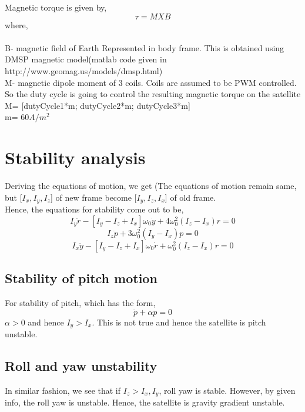 \documentclass[10pt,a4paper]{report}
\begin{document}
Magnetic torque is given by,
\begin{equation}
\tau=M X B
\end{equation}
where,\\ \\
B- magnetic field of Earth Represented in body frame. This is obtained using DMSP magnetic model(matlab code given in http://www.geomag.us/models/dmsp.html)\\ 
M- magnetic dipole moment of 3 coils.
Coils are assumed to be PWM controlled. So the duty cycle is going to control the resulting magnetic torque on the satellite \\
M= [dutyCycle1*m; dutyCycle2*m; dutyCycle3*m]\\
m= $60A/m^2$


\chapter{Stability analysis}
Deriving the equations of motion, we get (The equations of motion remain same, but [$I_{x},I_{y},I_{z}$] of new frame become [$I_{y},I_{z},I_{x}$] of old frame.\\
Hence, the equations for stability come out to be,
\begin{equation}
I_{y}\ddot{r}-[I_{y}-I_{z}+I_{x}]\omega_{0}\dot{y}+4\omega_{0}^{2}(I_{z}-I_{x})r=0
\end{equation}
\begin{equation}
I_{z}\ddot{p}+3\omega_{0}^{2}(I_{y}-I_{x})p=0
\end{equation}
\begin{equation}
I_{x}\ddot{y}-[I_{y}-I_{z}+I_{x}]\omega_{0}\dot{r}+\omega_{0}^{2}(I_{z}-I_{x})r=0
\end{equation}

\section{Stability of pitch motion}
For stability of pitch, which has the form,
\begin{equation}
\ddot{p}+\alpha p=0
\end{equation}
$ \alpha>0 $ and hence $ I_{y}>I_{x} $. This is not true and hence the satellite is pitch unstable.
\section{Roll and yaw unstability}
In similar fashion, we see that if $ I_{z}>I_{x},I_{y} $, roll yaw is stable. However, by given info, the roll yaw is unstable. Hence, the satellite is gravity gradient unstable. 
\end{document}
